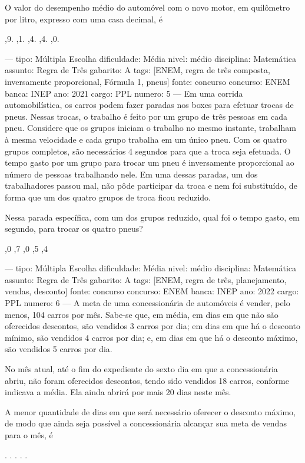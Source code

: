 O valor do desempenho médio do automóvel com o novo motor, em quilômetro por litro, expresso com uma casa decimal, é
\begin{choices}
,9.
,1.
,4.
,4.
,0.
\end{choices}

---
tipo: Múltipla Escolha
dificuldade: Média
nivel: médio
disciplina: Matemática
assunto: Regra de Três
gabarito: A
tags: [ENEM, regra de três composta, inversamente proporcional, Fórmula 1, pneus]
fonte: concurso
concurso: ENEM
banca: INEP
ano: 2021
cargo: PPL
numero: 5
---
\question
Em uma corrida automobilística, os carros podem fazer paradas nos boxes para efetuar trocas de pneus. Nessas trocas, o trabalho é feito por um grupo de três pessoas em cada pneu. Considere que os grupos iniciam o trabalho no mesmo instante, trabalham à mesma velocidade e cada grupo trabalha em um único pneu. Com os quatro grupos completos, são necessários 4 segundos para que a troca seja efetuada. O tempo gasto por um grupo para trocar um pneu é inversamente proporcional ao número de pessoas trabalhando nele. Em uma dessas paradas, um dos trabalhadores passou mal, não pôde participar da troca e nem foi substituído, de forma que um dos quatro grupos de troca ficou reduzido.

Nessa parada específica, com um dos grupos reduzido, qual foi o tempo gasto, em segundo, para trocar os quatro pneus?
\begin{choices}
,0
,7
,0
,5
,4
\end{choices}

---
tipo: Múltipla Escolha
dificuldade: Média
nivel: médio
disciplina: Matemática
assunto: Regra de Três
gabarito: A
tags: [ENEM, regra de três, planejamento, vendas, desconto]
fonte: concurso
concurso: ENEM
banca: INEP
ano: 2022
cargo: PPL
numero: 6
---
\question
A meta de uma concessionária de automóveis é vender, pelo menos, 104 carros por mês. Sabe-se que, em média, em dias em que não são oferecidos descontos, são vendidos 3 carros por dia; em dias em que há o desconto mínimo, são vendidos 4 carros por dia; e, em dias em que há o desconto máximo, são vendidos 5 carros por dia.

No mês atual, até o fim do expediente do sexto dia em que a concessionária abriu, não foram oferecidos descontos, tendo sido vendidos 18 carros, conforme indicava a média. Ela ainda abrirá por mais 20 dias neste mês.

A menor quantidade de dias em que será necessário oferecer o desconto máximo, de modo que ainda seja possível a concessionária alcançar sua meta de vendas para o mês, é
\begin{choices}
.
.
.
.
.
\end{choices}

